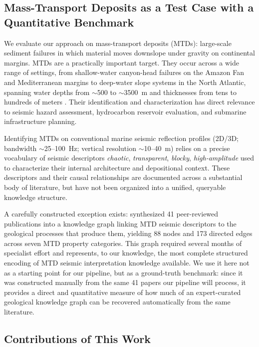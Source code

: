 \documentclass[10pt]{article}
\begin{document}
\subsection{Mass-Transport Deposits as a Test Case with a
Quantitative Benchmark}

We evaluate our approach on mass-transport deposits (MTDs):
large-scale sediment failures in which material moves downslope under
gravity on continental margins. MTDs are a practically important
target. They occur across a wide range of settings, from
shallow-water canyon-head failures on the Amazon Fan and
Mediterranean margins to deep-water slope systems in the North
Atlantic, spanning water depths from $\sim$500 to $\sim$3500~m and
thicknesses from tens to hundreds of meters
\citep{posamentier2011,moscardelli2008}. Their identification and
characterization has direct relevance to seismic hazard assessment,
hydrocarbon reservoir evaluation, and submarine infrastructure
planning.

Identifying MTDs on conventional marine seismic reflection profiles
(2D/3D; bandwidth $\sim$25--100~Hz; vertical resolution
$\sim$10--40~m) relies on a precise vocabulary of seismic
descriptors \emph{chaotic}, \emph{transparent}, \emph{blocky},
\emph{high-amplitude} used to characterize their internal
architecture and depositional context. These descriptors and their
causal relationships are documented across a substantial body of
literature, but have not been organized into a unified, queryable
knowledge structure.

A carefully constructed exception exists: \citet{LEBOUTEILLER2019438}
synthesized 41 peer-reviewed publications into a knowledge graph
linking MTD seismic descriptors to the geological processes that
produce them, yielding 88 nodes and 173 directed edges across seven
MTD property categories. This graph required several months of
specialist effort and represents, to our knowledge, the most
complete structured encoding of MTD seismic interpretation knowledge
available. We use it here not as a starting point for our pipeline,
but as a ground-truth benchmark: since it was constructed manually
from the same 41 papers our pipeline will process, it provides a
direct and quantitative measure of how much of an expert-curated
geological knowledge graph can be recovered automatically from the
same literature.

\subsection{Contributions of This Work}
\end{document}
